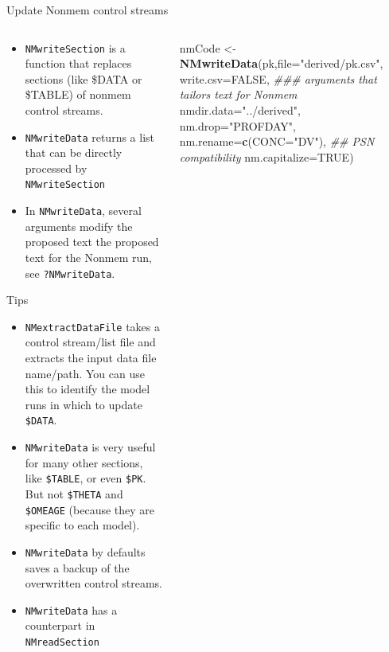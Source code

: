 \documentclass[
  8pt,
  ignorenonframetext,
  aspectratio=169]{beamer}
\newenvironment{Shaded}{\begin{snugshade}}{\end{snugshade}}
\newcommand{\CommentTok}[1]{\textcolor[rgb]{0.56,0.35,0.01}{\textit{#1}}}
\newcommand{\DataTypeTok}[1]{\textcolor[rgb]{0.13,0.29,0.53}{#1}}
\newcommand{\KeywordTok}[1]{\textcolor[rgb]{0.13,0.29,0.53}{\textbf{#1}}}
\newcommand{\NormalTok}[1]{#1}
\newcommand{\OtherTok}[1]{\textcolor[rgb]{0.56,0.35,0.01}{#1}}
\newcommand{\StringTok}[1]{\textcolor[rgb]{0.31,0.60,0.02}{#1}}
\begin{document}
\begin{frame}[fragile]{Update Nonmem control streams}
\protect\hypertarget{update-nonmem-control-streams}{}
\begin{columns}[T]
\begin{column}{0.48\textwidth}
\begin{itemize}
\item
  \texttt{NMwriteSection} is a function that replaces sections (like
  \$DATA or \$TABLE) of nonmem control streams.
\item
  \texttt{NMwriteData} returns a list that can be directly processed by
  \texttt{NMwriteSection}
\item
  In \texttt{NMwriteData}, several arguments modify the proposed text
  the proposed text for the Nonmem run, see \texttt{?NMwriteData}.
\end{itemize}

\begin{block}{Tips}
\protect\hypertarget{tips}{}
\begin{itemize}
\item
  \texttt{NMextractDataFile} takes a control stream/list file and
  extracts the input data file name/path. You can use this to identify
  the model runs in which to update \texttt{\$DATA}.
\item
  \texttt{NMwriteData} is very useful for many other sections, like
  \texttt{\$TABLE}, or even \texttt{\$PK}. But not \texttt{\$THETA} and
  \texttt{\$OMEAGE} (because they are specific to each model).
\item
  \texttt{NMwriteData} by defaults saves a backup of the overwritten
  control streams.
\item
  \texttt{NMwriteData} has a counterpart in \texttt{NMreadSection}
\end{itemize}
\end{block}
\end{column}

\begin{column}{0.48\textwidth}
\footnotesize

\begin{Shaded}
\begin{Highlighting}[]
\NormalTok{nmCode \textless{}{-}}\StringTok{ }\KeywordTok{NMwriteData}\NormalTok{(pk,}\DataTypeTok{file=}\StringTok{"derived/pk.csv"}\NormalTok{,}
                      \DataTypeTok{write.csv=}\OtherTok{FALSE}\NormalTok{,}
\CommentTok{\#\#\# arguments that tailors text for Nonmem}
                      \DataTypeTok{nmdir.data=}\StringTok{"../derived"}\NormalTok{,}
                      \DataTypeTok{nm.drop=}\StringTok{"PROFDAY"}\NormalTok{,}
                      \DataTypeTok{nm.rename=}\KeywordTok{c}\NormalTok{(}\DataTypeTok{CONC=}\StringTok{"DV"}\NormalTok{),}
                      \CommentTok{\#\# PSN compatibility}
                      \DataTypeTok{nm.capitalize=}\OtherTok{TRUE}\NormalTok{)}
\end{Highlighting}
\end{Shaded}


\end{column}
\end{columns}
\end{frame}
\end{document}
